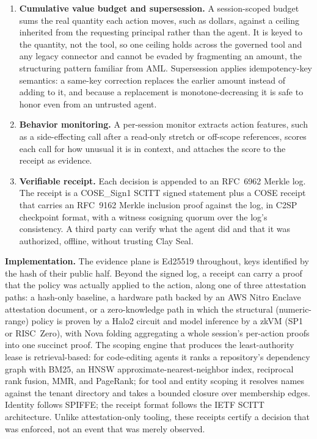 \documentclass[10pt]{article}
\begin{document}
\begin{enumerate}[leftmargin=1.4em, itemsep=3pt, topsep=3pt, parsep=0pt]
\item \textbf{Cumulative value budget and supersession.} A session-scoped budget sums the real quantity each action moves, such as dollars, against a ceiling inherited from the requesting principal rather than the agent. It is keyed to the quantity, not the tool, so one ceiling holds across the governed tool and any legacy connector and cannot be evaded by fragmenting an amount, the structuring pattern familiar from AML. Supersession applies idempotency-key semantics: a same-key correction replaces the earlier amount instead of adding to it, and because a replacement is monotone-decreasing it is safe to honor even from an untrusted agent.

\item \textbf{Behavior monitoring.} A per-session monitor extracts action features, such as a side-effecting call after a read-only stretch or off-scope references, scores each call for how unusual it is in context, and attaches the score to the receipt as evidence.

\item \textbf{Verifiable receipt.} Each decision is appended to an RFC~6962 Merkle log. The receipt is a COSE\_Sign1 SCITT signed statement plus a COSE receipt that carries an RFC~9162 Merkle inclusion proof against the log, in C2SP checkpoint format, with a witness cosigning quorum over the log's consistency. A third party can verify what the agent did and that it was authorized, offline, without trusting Clay Seal.

\end{enumerate}

\textbf{Implementation.} The evidence plane is Ed25519 throughout, keys identified by the hash of their public half. Beyond the signed log, a receipt can carry a proof that the policy was actually applied to the action, along one of three attestation paths: a hash-only baseline, a hardware path backed by an AWS Nitro Enclave attestation document, or a zero-knowledge path in which the structural (numeric-range) policy is proven by a Halo2 circuit and model inference by a zkVM (SP1 or RISC~Zero), with Nova folding aggregating a whole session's per-action proofs into one succinct proof. The scoping engine that produces the least-authority lease is retrieval-based: for code-editing agents it ranks a repository's dependency graph with BM25, an HNSW approximate-nearest-neighbor index, reciprocal rank fusion, MMR, and PageRank; for tool and entity scoping it resolves names against the tenant directory and takes a bounded closure over membership edges. Identity follows SPIFFE; the receipt format follows the IETF SCITT architecture. Unlike attestation-only tooling, these receipts certify a decision that was enforced, not an event that was merely observed.
\end{document}
